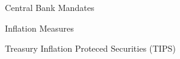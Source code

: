 \documentclass[10pt]{article}
\begin{document}

    \begin{core}{Central Bank Mandates}




    \end{core}

    \begin{core}{Inflation Measures}



    \end{core}

    \begin{core}{Treasury Inflation Proteced Securities (TIPS)}


    \end{core}
\end{document}
